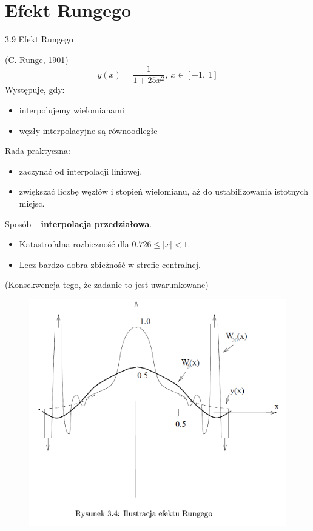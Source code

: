 \section{Efekt Rungego}
\begin{frame}
{3.9 Efekt Rungego}

(C. Runge, 1901)
$$
y(x)=\frac{1}{1+25x^{2}},\ x\in[-1,\ 1]
$$
Występuje, gdy:
\begin{itemize}
\item interpolujemy wielomianami

\item węzły interpolacyjne są równoodległe
\end{itemize}

Rada praktyczna:

\begin{itemize}
\item zaczynać od interpolacji liniowej,

\item zwiększać liczbę węzłów i stopień wielomianu, aż do ustabilizowania istotnych miejsc.
\end{itemize}


Sposób -- \textbf{interpolacja przedziałowa}.
\begin{itemize}
\item Katastrofalna rozbiezność dla $0.726\leq|x|<1$.

\item Lecz bardzo dobra zbieżność w strefie centralnej.
\end{itemize}

(Konsekwencja tego, że zadanie to jest { uwarunkowane})
\end{frame}
\begin{frame}
\begin{figure}[h]
			\includegraphics[scale=0.35]{img/3/interpol_3_9}
	\end{figure}
\end{frame}
